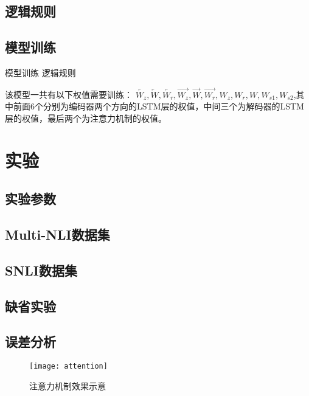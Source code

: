 \documentclass[UTF8,11pt,a4paper,nofonts]{ctexart}
\begin{document}
\subsection{逻辑规则}



\subsection{模型训练}

模型训练
逻辑规则

该模型一共有以下权值需要训练：
$\overleftarrow{W_z}, \overleftarrow{W}, \overleftarrow{W_r}, \overrightarrow{W_z}, \overrightarrow{W}, \overrightarrow{W_r},W_z, W_r, W, W_{s1}, W_{s2}$,其中前面6个分别为编码器两个方向的LSTM层的权值，中间三个为解码器的LSTM层的权值，最后两个为注意力机制的权值。



\section{实验}


\subsection{实验参数}
\subsection{Multi-NLI数据集}
\subsection{SNLI数据集}
\subsection{缺省实验}

\subsection{误差分析}


\begin{figure}
\centering
\texttt{[image: attention]}
\caption{注意力机制效果示意}\label{fig:02}
\end{figure} 
\end{document}
